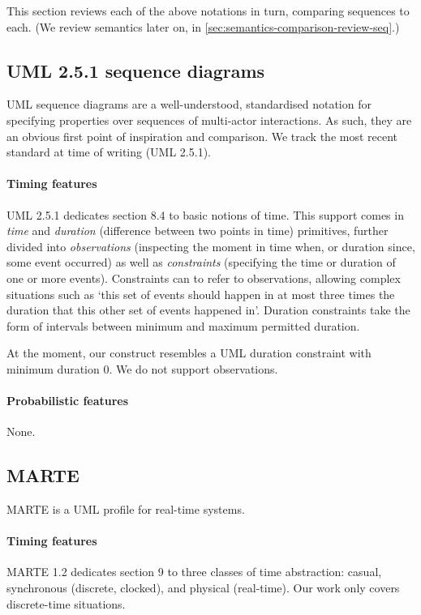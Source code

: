 
This section reviews each of the above notations in turn, comparing
\langname{} sequences to each.  (We review semantics
later on, in \cref{sec:semantics-comparison-review-seq}.)

\subsection{UML 2.5.1 sequence diagrams}

UML sequence diagrams are a well-understood, standardised notation for
specifying properties over sequences of multi-actor interactions.  As such, they
are an obvious first point of inspiration and comparison.  We track the most
recent standard at time of writing (UML 2.5.1).

\paragraph{Timing features}
UML 2.5.1 dedicates section 8.4 to basic notions of time.  This
support comes in \emph{time} and \emph{duration} (difference between two points
in time) primitives, further divided into \emph{observations} (inspecting the
moment in time when, or duration since, some event occurred) as well as
\emph{constraints} (specifying the time or duration of one or more events).
Constraints can to refer to observations, allowing complex situations such as
`this set of events should happen in at most three times the duration that
this other set of events happened in'.  Duration constraints take the
form of intervals between minimum and maximum permitted duration.

At the moment, our \mdeadlinestep{} construct resembles a UML duration
constraint with minimum duration \(0\).  We do not support observations.

\paragraph{Probabilistic features}
None.  

\subsection{MARTE}

MARTE is a UML profile for real-time systems.

\paragraph{Timing features}
MARTE 1.2 dedicates section 9 to three classes of time abstraction:
casual, synchronous (discrete, clocked), and physical (real-time).  Our work
only covers discrete-time
situations.

